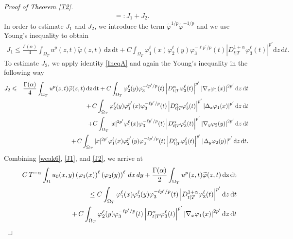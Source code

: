\documentclass[reqno,11pt]{amsart}
\numberwithin{equation}{section}
\begin{document}
\begin{proof}[Proof of Theorem \ref{T2}]
\begin{eqnarray}
		&&=: J_1+J_2. \label{weak6}
	\end{eqnarray}
	\noindent In order to estimate $J_1$ and $J_2$, we introduce the term 
	$\widetilde{\varphi}^{1/p}\widetilde{\varphi}^{-1/p}$ and we use Young's inequality to obtain
	\begin{align}\label{J1}
		J_1\leqslant\frac{\Gamma(\alpha)}{4} \int_{\Omega_T}u^{p}(z,t)\widetilde{\varphi}(z,t)\,\mathrm{dz}\,\mathrm{dt}+C\int_{\Omega_T}\varphi_1^\ell(x)\varphi_2^\ell(y)\varphi_3^{-\ell p^\prime/p}(t)\left|D^{1+\alpha}_{t|T} \varphi^\ell_3(t)\right|^{p'}\mathrm{d}z\,\mathrm{d}t.
	\end{align}
	To estimate $J_2$, we apply identity \eqref{IneqA} and again the Young's inequality in the following way
	\begin{eqnarray}\label{J2}
		J_2&\leqslant&\frac{\Gamma(\alpha)}{4} \int_{\Omega_T}u^{p}(z,t)\widetilde{\varphi}(z,t)\,\mathrm{dz}\,\mathrm{dt}+C\int_{\Omega_T}\varphi_2^\ell(y)\varphi_3^{-\ell p^\prime/p}(t)\left|D^{\alpha}_{t|T} \varphi^\ell_3(t)\right|^{p'}\left|\nabla_x \varphi_1(x)\right|^{2p'}\mathrm{d}z\,\mathrm{d}t\notag\\
		&{}&+\,C\int_{\Omega_T}\varphi_2^\ell(y)\varphi_1^{p'}(x)\varphi_3^{-\ell p^\prime/p}(t)\left|D^{\alpha}_{t|T} \varphi^\ell_3(t)\right|^{p'}\left|\Delta_x \varphi_1(x)\right|^{p'}\mathrm{d}z\,\mathrm{d}t\nonumber\\
		&&+C\int_{\Omega_T}|x|^{2p'}\varphi_1^\ell(x)\varphi_3^{-\ell p^\prime/p}(t)\left|D^{\alpha}_{t|T} \varphi^\ell_3(t)\right|^{p'}\left|\nabla_y \varphi_2(y)\right|^{2p'}\mathrm{d}z\,\mathrm{d}t\notag\\
		&{}&+\,C\int_{\Omega_T}|x|^{2p'}\varphi_1^\ell(x)\varphi_2^{p'}(y)\varphi_3^{-\ell p^\prime/p}(t)\left|D^{\alpha}_{t|T} \varphi^\ell_3(t)\right|^{p'}\left|\Delta_y \varphi_2(y)\right|^{p'}\mathrm{d}z\,\mathrm{d}t.
	\end{eqnarray}
	Combining \eqref{weak6}, \eqref{J1}, and \eqref{J2}, we arrive at
	\begin{eqnarray}\label{weak7}
		&{}&C\,T^{-\alpha}\int_{\Omega}u_0(x,y)\left(\varphi_1(x)\right)^\ell \left(\varphi_2(y)\right)^\ell\,dx\,dy+\frac{\Gamma(\alpha)}{2}\int_{\Omega_T}u^{p}(z,t)\widetilde{\varphi}(z,t)\,\mathrm{dz}\,\mathrm{dt}\notag\\
		&{}&\leq C\int_{\Omega_T}\varphi_1^\ell(x)\varphi_2^\ell(y)\varphi_3^{-\ell p^\prime/p}(t)\left|D^{1+\alpha}_{t|T} \varphi^\ell_3(t)\right|^{p'}\mathrm{d}z\,\mathrm{d}t\notag\\&&\quad+\,C\int_{\Omega_T}\varphi_2^\ell(y)\varphi_3^{-\ell p^\prime/p}(t)\left|D^{\alpha}_{t|T} \varphi^\ell_3(t)\right|^{p'}\left|\nabla_x \varphi_1(x)\right|^{2p'}\mathrm{d}z\,\mathrm{d}t\notag\\

\end{eqnarray}
\end{proof}
\end{document}
